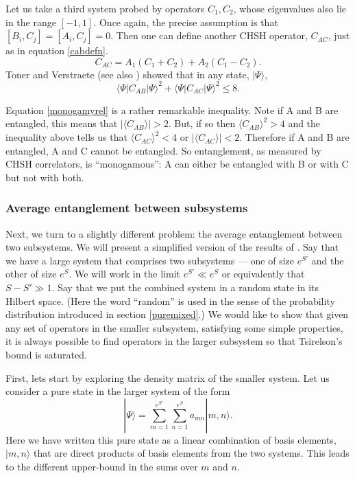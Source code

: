 \documentclass[12pt]{article}
\newcommand{\be}{\begin{equation}}
\newcommand{\ee}{\end{equation}}
\begin{document}
Let us take a third system probed by operators $C_1, C_2$, whose eigenvalues also lie in the range $[-1,1]$. Once again, the precise assumption is that  $[B_i, C_j] = [A_i, C_j] = 0$. Then one can define another CHSH operator, $C_{AC}$, just as in equation \eqref{cabdefn}. 
\be
\label{cacdefn}
C_{AC} =  A_1 (C_1 + C_2)  +  A_2 (C_1 - C_2).
\ee
Toner and Verstraete \cite{toner2006monogamy} (see also \cite{toner2009monogamy}) showed that in any state, $|\Psi \rangle$,
\be
\label{monogamyrel}
\langle \Psi| C_{A B} |\Psi \rangle^2 + \langle \Psi| C_{A C} |\Psi \rangle^2 \leq 8.
\ee

Equation \eqref{monogamyrel} is a rather remarkable inequality. Note if A and B are entangled, this means that $|\langle C_{AB} \rangle| > 2.$ But, if so then $\langle C_{AB} \rangle ^2 > 4$ and the inequality above tells us that $\langle C_{AC} \rangle^2 < 4$ or $|\langle C_{AC} \rangle| < 2$. Therefore if A and B are entangled, A and C cannot be entangled. So entanglement, as measured by CHSH correlators, is ``monogamous'': A can either be entangled with B or with C but not with both.

\subsubsection{Average entanglement between subsystems \label{secavent}}
Next, we turn to a slightly different problem: the average entanglement between two subsystems. We will present a simplified version of the results of \cite{Page:1993df,lubkin1978entropy}. Say that we have a large system that comprises two subsystems --- one of size $e^{S'}$ and the other of size $e^{S}$. We will work in the limit $e^{S'} \ll e^{S}$ or equivalently that $S - S' \gg 1$.  Say that
we put the combined system in a random state in its Hilbert space. (Here the word ``random'' is used in the sense of the probability distribution introduced in section \eqref{puremixed}.)  We would like to show that given any set
of operators in the smaller subsystem, satisfying some simple properties, it is always possible to find operators in the larger subsystem so that Tsirelson's bound is saturated.


First, lets start by exploring the density matrix of the smaller system. Let us consider a pure state in the larger system of the form
\be
|\Psi \rangle = \sum_{m=1}^{e^{S'}} \sum_{n=1}^{e^{S}} a_{m n} |m, n \rangle.
\ee
Here we have written this pure state as a linear combination of basis elements, $|m, n \rangle$ that are direct products of basis elements from the two systems. This leads to the different upper-bound in the sums over $m$ and $n$.
\end{document}
